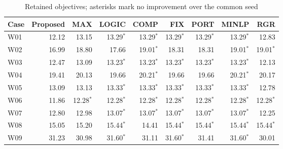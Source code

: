 \begin{table}[!t]
\centering\caption{Retained objectives; asterisks mark no improvement over the common seed}
\label{tab:per-case}
\footnotesize\begin{tabular}{lrrrrrrrr}
\toprule
Case & Proposed & MAX & LOGIC & COMP & FIX & PORT & MINLP & RGR\\
\midrule
W01 & 12.12 & 13.15 & 13.29$^*$ & 13.29$^*$ & 13.29$^*$ & 13.29$^*$ & 13.29$^*$ & 12.83\\
W02 & 16.99 & 18.80 & 17.66 & 19.01$^*$ & 18.31 & 18.31 & 19.01$^*$ & 19.01$^*$\\
W03 & 12.47 & 13.09 & 13.23$^*$ & 13.23$^*$ & 13.23$^*$ & 13.23$^*$ & 13.23$^*$ & 12.13\\
W04 & 19.41 & 20.13 & 19.66 & 20.21$^*$ & 19.66 & 19.66 & 20.21$^*$ & 20.17\\
W05 & 13.09 & 13.13 & 13.33$^*$ & 13.33$^*$ & 13.33$^*$ & 13.33$^*$ & 13.33$^*$ & 12.78\\
W06 & 11.86 & 12.28$^*$ & 12.28$^*$ & 12.28$^*$ & 12.28$^*$ & 12.28$^*$ & 12.28$^*$ & 12.28$^*$\\
W07 & 12.80 & 12.98 & 13.07$^*$ & 13.07$^*$ & 13.07$^*$ & 13.07$^*$ & 13.07$^*$ & 12.25\\
W08 & 15.05 & 15.20 & 15.44$^*$ & 14.41 & 15.44$^*$ & 15.44$^*$ & 15.44$^*$ & 15.44$^*$\\
W09 & 31.23 & 30.98 & 31.60$^*$ & 31.11 & 31.60$^*$ & 31.41 & 31.60$^*$ & 30.01\\
\bottomrule\end{tabular}
\end{table}
